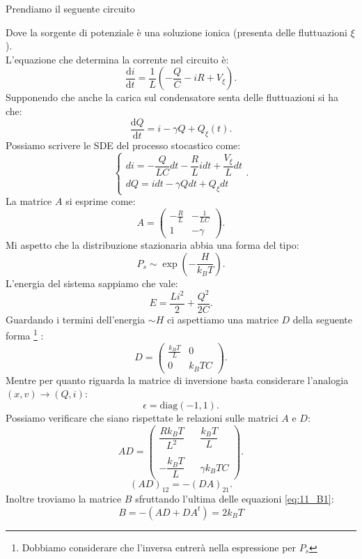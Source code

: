 \begin{exmp}
    Prendiamo il seguente circuito
    
    Dove la sorgente di potenziale è una soluzione ionica (presenta delle fluttuazioni $\xi$).\\
    L'equazione che determina la corrente nel circuito è:
    \[
        \frac{\text{d} i}{\text{d} t} = \frac{1}{L}\left(-\frac{Q}{C}-iR +V_\xi\right)
    .\] 
    Supponendo che anche la carica sul condensatore senta delle fluttuazioni si ha che:
    \[
	\frac{\text{d} Q}{\text{d} t} = i - \gamma Q + Q_\xi(t) 
    .\] 
    Possiamo scrivere le SDE del processo stocastico come:
    \[
       \begin{cases}
 	 di = - \dfrac{Q}{LC}dt -\dfrac{R}{L}idt +\dfrac{V_\xi}{L}dt\\
	 dQ = idt - \gamma Q dt + Q_\xi dt          
       \end{cases} 
    .\] 
    La matrice $A$ si esprime come:
    \[
        A = 
	\begin{pmatrix} 
	    -\frac{R}{L} & -\frac{1}{LC}\\
	    1            & - \gamma
	\end{pmatrix} 
    .\] 
    Mi aspetto che la distribuzione stazionaria abbia una forma del tipo:
    \[
        P_s \sim \exp\left(-\frac{H}{k_BT}\right)
    .\] 
    L'energia del sistema sappiamo che vale:
    \[
        E = \frac{Li^2}{2} + \frac{Q^2}{2C}
    .\] 
    Guardando i termini dell'energia $\sim H$ ci aspettiamo una matrice $D$ della seguente forma
    \footnote{Dobbiamo considerare che l'inversa entrerà nella espressione per $P_s$}
    :
    \[
        D = 
	\begin{pmatrix}
	    \frac{k_BT}{L} & 0 \\
	    0              & k_BT C
	\end{pmatrix} 
    .\] 
    Mentre per quanto riguarda la matrice di inversione basta considerare l'analogia $(x,v) \to (Q,i)$:
    \[
	\epsilon  = \text{diag}(-1,1) 
    .\] 
    Possiamo verificare che siano rispettate le relazioni sulle matrici $A$ e $D$:
    \[
	AD = 
	\begin{pmatrix} 
	    \dfrac{Rk_BT}{L^2} & &  \dfrac{k_BT}{L}   \\
	     &&\\
	    - \dfrac{k_BT}{L} & & \gamma k_BTC 
	\end{pmatrix} 
    .\] 
    \[
	(AD)_{12} = -(DA)_{21} 
    .\] 
    Inoltre troviamo la matrice $B$ sfruttando l'ultima delle equazioni \ref{eq:11_B1}:
    \[
        B = -\left(AD+DA^t\right) = 2k_BT 
\]
\end{exmp}
